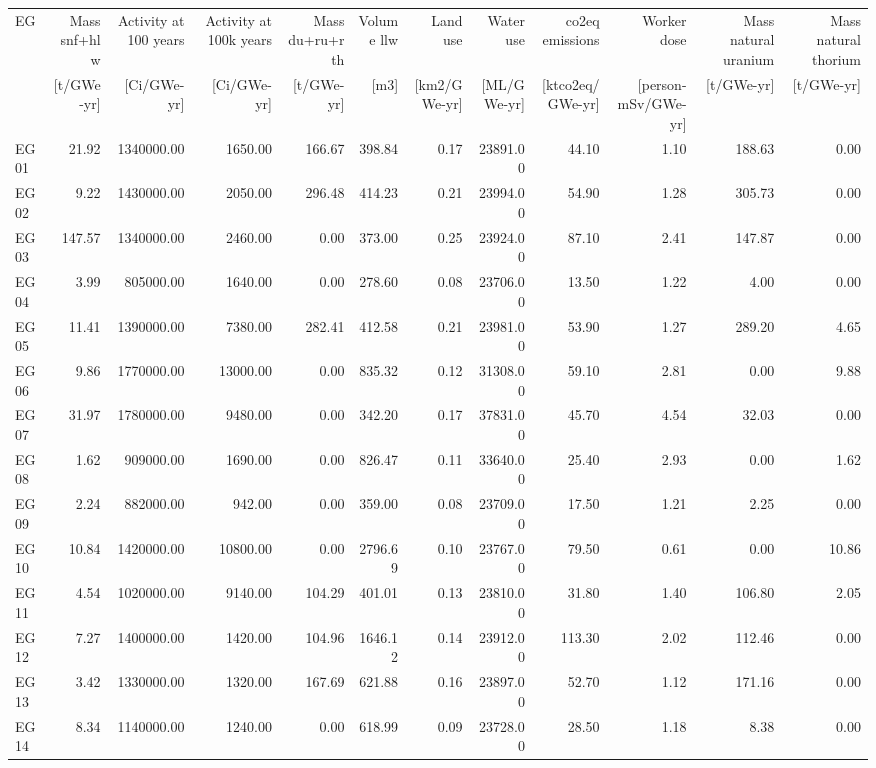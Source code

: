 \begin{tabular}{lrrrrrrrrrrr}
    \toprule
    EG & Mass \acs{snf}+\acs{hlw} & Activity at 100 years & Activity at 100k years & Mass \acs{du}+\acs{ru}+\acs{rth}& Volume \acs{llw} & Land use & Water use & \acs{co2eq} emissions & Worker dose & Mass natural uranium & Mass natural thorium \\
    & [t/GWe-yr] & [Ci/GWe-yr] & [Ci/GWe-yr] & [t/GWe-yr] & [m3] & [km2/GWe-yr] & [ML/GWe-yr] & [kt\acs{co2eq}/GWe-yr] & [person-mSv/GWe-yr] & [t/GWe-yr] & [t/GWe-yr] \\
    \midrule
    EG01 & 21.92 & 1340000.00 & 1650.00 & 166.67 & 398.84 & 0.17 & 23891.00 & 44.10 & 1.10 & 188.63 & 0.00 \\
    EG02 & 9.22 & 1430000.00 & 2050.00 & 296.48 & 414.23 & 0.21 & 23994.00 & 54.90 & 1.28 & 305.73 & 0.00 \\
    EG03 & 147.57 & 1340000.00 & 2460.00 & 0.00 & 373.00 & 0.25 & 23924.00 & 87.10 & 2.41 & 147.87 & 0.00 \\
    EG04 & 3.99 & 805000.00 & 1640.00 & 0.00 & 278.60 & 0.08 & 23706.00 & 13.50 & 1.22 & 4.00 & 0.00 \\
    EG05 & 11.41 & 1390000.00 & 7380.00 & 282.41 & 412.58 & 0.21 & 23981.00 & 53.90 & 1.27 & 289.20 & 4.65 \\
    EG06 & 9.86 & 1770000.00 & 13000.00 & 0.00 & 835.32 & 0.12 & 31308.00 & 59.10 & 2.81 & 0.00 & 9.88 \\
    EG07 & 31.97 & 1780000.00 & 9480.00 & 0.00 & 342.20 & 0.17 & 37831.00 & 45.70 & 4.54 & 32.03 & 0.00 \\
    EG08 & 1.62 & 909000.00 & 1690.00 & 0.00 & 826.47 & 0.11 & 33640.00 & 25.40 & 2.93 & 0.00 & 1.62 \\
    EG09 & 2.24 & 882000.00 & 942.00 & 0.00 & 359.00 & 0.08 & 23709.00 & 17.50 & 1.21 & 2.25 & 0.00 \\
    EG10 & 10.84 & 1420000.00 & 10800.00 & 0.00 & 2796.69 & 0.10 & 23767.00 & 79.50 & 0.61 & 0.00 & 10.86 \\
    EG11 & 4.54 & 1020000.00 & 9140.00 & 104.29 & 401.01 & 0.13 & 23810.00 & 31.80 & 1.40 & 106.80 & 2.05 \\
    EG12 & 7.27 & 1400000.00 & 1420.00 & 104.96 & 1646.12 & 0.14 & 23912.00 & 113.30 & 2.02 & 112.46 & 0.00 \\
    EG13 & 3.42 & 1330000.00 & 1320.00 & 167.69 & 621.88 & 0.16 & 23897.00 & 52.70 & 1.12 & 171.16 & 0.00 \\
    EG14 & 8.34 & 1140000.00 & 1240.00 & 0.00 & 618.99 & 0.09 & 23728.00 & 28.50 & 1.18 & 8.38 & 0.00 \\

\end{tabular}
